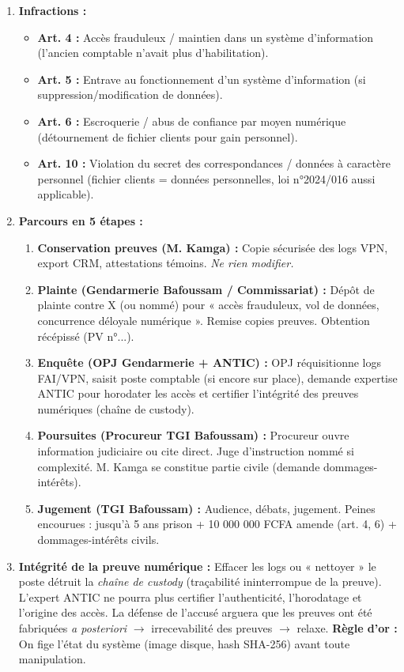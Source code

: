 \documentclass[11pt]{article}
\begin{document}
\begin{corrige}
\begin{enumerate}
    \item \textbf{Infractions :}
    \begin{itemize}
        \item \textbf{Art. 4 :} Accès frauduleux / maintien dans un système d'information (l'ancien comptable n'avait plus d'habilitation).
        \item \textbf{Art. 5 :} Entrave au fonctionnement d'un système d'information (si suppression/modification de données).
        \item \textbf{Art. 6 :} Escroquerie / abus de confiance par moyen numérique (détournement de fichier clients pour gain personnel).
        \item \textbf{Art. 10 :} Violation du secret des correspondances / données à caractère personnel (fichier clients = données personnelles, loi n°2024/016 aussi applicable).
    \end{itemize}
    \item \textbf{Parcours en 5 étapes :}
    \begin{enumerate}
        \item \textbf{Conservation preuves (M. Kamga) :} Copie sécurisée des logs VPN, export CRM, attestations témoins. \emph{Ne rien modifier.}
        \item \textbf{Plainte (Gendarmerie Bafoussam / Commissariat) :} Dépôt de plainte contre X (ou nommé) pour « accès frauduleux, vol de données, concurrence déloyale numérique ». Remise copies preuves. Obtention récépissé (PV n°...).
        \item \textbf{Enquête (OPJ Gendarmerie + ANTIC) :} OPJ réquisitionne logs FAI/VPN, saisit poste comptable (si encore sur place), demande expertise ANTIC pour horodater les accès et certifier l'intégrité des preuves numériques (chaîne de custody).
        \item \textbf{Poursuites (Procureur TGI Bafoussam) :} Procureur ouvre information judiciaire ou cite direct. Juge d'instruction nommé si complexité. M. Kamga se constitue partie civile (demande dommages-intérêts).
        \item \textbf{Jugement (TGI Bafoussam) :} Audience, débats, jugement. Peines encourues : jusqu'à 5 ans prison + 10 000 000 FCFA amende (art. 4, 6) + dommages-intérêts civils.
    \end{enumerate}
    \item \textbf{Intégrité de la preuve numérique :} Effacer les logs ou « nettoyer » le poste détruit la \emph{chaîne de custody} (traçabilité ininterrompue de la preuve). L'expert ANTIC ne pourra plus certifier l'authenticité, l'horodatage et l'origine des accès. La défense de l'accusé arguera que les preuves ont été fabriquées \emph{a posteriori} $\rightarrow$ irrecevabilité des preuves $\rightarrow$ relaxe. \textbf{Règle d'or :} On fige l'état du système (image disque, hash SHA-256) avant toute manipulation.
\end{enumerate}
\end{corrige}
\end{document}
